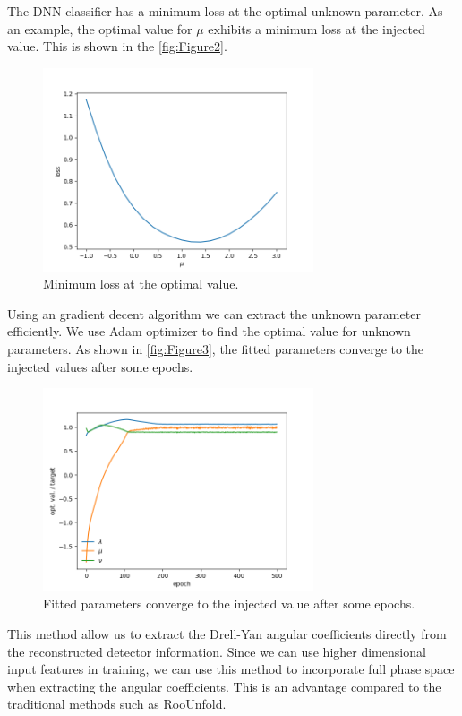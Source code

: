 \documentclass{article}
\begin{document}
The DNN classifier has a minimum loss at the optimal unknown parameter\cite{Andreassen:2019nnm}. As an example, the optimal value for $\mu$ exhibits a minimum loss at the injected value. This is shown in the \autoref{fig:Figure2}.

\begin{figure}[H]
\begin{center}
	\includegraphics[width=8.0cm]{imgs/loss1D.png}
	\caption{Minimum loss at the optimal value.}
	\label{fig:Figure2}
\end{center}
\end{figure}

Using an gradient decent algorithm we can extract the unknown parameter efficiently. We use Adam optimizer to find the optimal value for unknown parameters. As shown in \autoref{fig:Figure3}, the fitted parameters converge to the injected values after some epochs.

\begin{figure}[H]
\begin{center}
	\includegraphics[width=8.0cm]{imgs/opt_fit.png}
	\caption{Fitted parameters converge to the injected value after some epochs.}
	\label{fig:Figure3}
\end{center}
\end{figure}

This method allow us to extract the Drell-Yan angular coefficients directly from the reconstructed detector information. Since we can use higher dimensional input features in training, we can use this method to incorporate full phase space when extracting the angular coefficients. This is an advantage compared to the traditional methods such as RooUnfold.\cite{Brenner:2019lmf}
\end{document}

